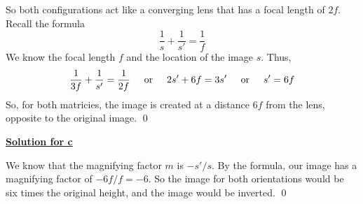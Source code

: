 \documentclass{article}
\newcommand{\new}[1]{
    \vspace{2mm}
    \noindent
    \textbf{
    \underline{#1}}
}
\newcommand{\textOr}{
    {
        \hspace{5mm}
        \textrm{or}
        \hspace{5mm}
    }
}
\begin{document}
So both configurations act like a converging lens that has 
a focal length of $2f$. Recall the formula 
\[
    \frac 1 s + \frac 1 {s'} = \frac 1 f
\]
We know the focal length $f$ and the location of the image $s$. Thus, 
\[
    \frac 1 {3f} + \frac 1 {s'} = \frac 1 {2f}
    \textOr 
    2s' + 6f = 3s' 
    \textOr 
    s' = 6f
\]
So, for both matricies, the image is created at a distance $6f$ from 
the lens, opposite to the original image. 
\hfill \qed

\new{Solution for c}
We know that the magnifying factor $m$ is $-s'/s$. By the formula, 
our image has a magnifying factor of $-6f/f = -6$. So the image 
for both orientations would be six times the original height, and 
the image would be inverted. 
\hfill \qed
\end{document}
